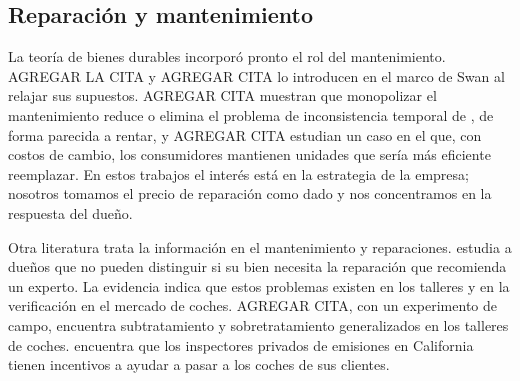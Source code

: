 \documentclass{article}
\begin{document}
\subsection{Reparación y mantenimiento}

La teoría de bienes durables incorporó pronto el rol del mantenimiento. \textcite{schmalensee} AGREGAR LA CITA y \textcite{su1975} AGREGAR CITA lo introducen en el marco de Swan al relajar sus supuestos. \textcite{Morita Waldman 2004} AGREGAR CITA muestran que monopolizar el mantenimiento reduce o elimina el problema de inconsistencia temporal de \textcite{Bulow1982}, de forma parecida a rentar, y \textcite{Morita Waldman 2010} AGREGAR CITA estudian un caso en el que, con costos de cambio, los consumidores mantienen unidades que sería más eficiente reemplazar. En estos trabajos el interés está en la estrategia de la empresa; nosotros tomamos el precio de reparación como dado y nos concentramos en la respuesta del dueño.

Otra literatura trata la información en el mantenimiento y reparaciones. \textcite{taylor 1995} estudia a dueños que no pueden distinguir si su bien necesita la reparación que recomienda un experto. La evidencia indica que estos problemas existen en los talleres y en la verificación en el mercado de coches. \textcite{schneider 2012} AGREGAR CITA, con un experimento de campo, encuentra subtratamiento y sobretratamiento generalizados en los talleres de coches. \textcite{Hubbard1998} encuentra que los inspectores privados de emisiones en California tienen incentivos a ayudar a pasar a los coches de sus clientes.
\end{document}
